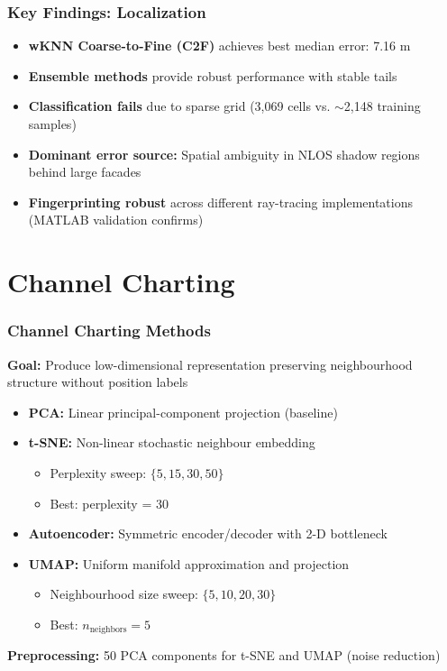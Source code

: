 \documentclass{beamer}
\begin{document}
\begin{frame}
\frametitle{Key Findings: Localization}
\begin{itemize}
  \item \textbf{wKNN Coarse-to-Fine (C2F)} achieves best median error: 7.16 m
  \item \textbf{Ensemble methods} provide robust performance with stable tails
  \item \textbf{Classification fails} due to sparse grid (3,069 cells vs. $\sim$2,148 training samples)
  \item \textbf{Dominant error source:} Spatial ambiguity in NLOS shadow regions behind large facades
  \item \textbf{Fingerprinting robust} across different ray-tracing implementations (MATLAB validation confirms)
\end{itemize}
\end{frame}

\section{Channel Charting}

\begin{frame}
\frametitle{Channel Charting Methods}
\textbf{Goal:} Produce low-dimensional representation preserving neighbourhood structure without position labels

\vspace{0.3cm}
\begin{itemize}
  \item \textbf{PCA:} Linear principal-component projection (baseline)
  \item \textbf{t-SNE:} Non-linear stochastic neighbour embedding
  \begin{itemize}
    \item Perplexity sweep: $\{5, 15, 30, 50\}$
    \item Best: perplexity = 30
  \end{itemize}
  \item \textbf{Autoencoder:} Symmetric encoder/decoder with 2-D bottleneck
  \item \textbf{UMAP:} Uniform manifold approximation and projection
  \begin{itemize}
    \item Neighbourhood size sweep: $\{5, 10, 20, 30\}$
    \item Best: $n_{\text{neighbors}} = 5$
  \end{itemize}
\end{itemize}

\vspace{0.3cm}
\textbf{Preprocessing:} 50 PCA components for t-SNE and UMAP (noise reduction)
\end{frame}
\end{document}
